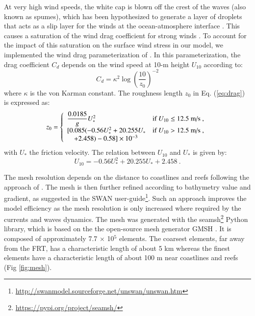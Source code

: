 \documentclass[preprint,12pt,authoryear]{elsarticle}
\begin{document}
At very high wind speeds, the white cap is blown off the crest of the waves (also known as spumes), which has been hypothesized to generate a layer of droplets that acts as a slip layer for the winds at the ocean-atmosphere interface \citep{holthuijsen2012wind}. This causes a saturation of the wind drag coefficient for strong winds \citep{donelan2004limiting,curcic2020revised,powell2003reduced}. To account for the impact of this saturation on the surface wind stress in our model, we implemented the wind drag parameterization of \cite{moon2007physics}. In this parameterization, the drag coefficient $C_d$ depends on the wind speed at 10-m height $U_{10}$ according to:
\begin{equation}
    C_d = \kappa^2 \log\left(\dfrac{10}{z_0}\right)^{-2}\label{eq:drag}
\end{equation}
where $\kappa$ is the von Karman constant. The roughness length $z_0$ in Eq. (\ref{eq:drag}) is expressed as: 
\begin{equation}
    z_0 =\left\{\begin{array}[]{ll}
        \dfrac{0.0185}{g}U_{\ast}^2 & \text{if }U_{10} \leq 12.5\text{ m/s}~, \\
        \lbrack 0.085(-0.56U_{\ast}^2+20.255U_{\ast} & \text{if }U_{10} > 12.5\text{ m/s}~, \\
        \quad +2.458) - 0.58\rbrack\times 10^{-3} 
    \end{array}\right.
\end{equation}
with $U_\ast$ the friction velocity. The relation between $U_{10}$ and $U_{\ast}$ is given by:
\begin{equation}
    U_{10}=-0.56U_{\ast}^2+20.255U_{\ast}+2.458~.
\end{equation}

The mesh resolution depends on the distance to coastlines and reefs following the approach of \cite{dobbelaere2020coupled}. The mesh is then further refined according to bathymetry value and gradient, as suggested in the SWAN user-guide\footnote{\url{http://swanmodel.sourceforge.net/unswan/unswan.htm}}. Such an approach improves the model efficiency as the mesh resolution is only increased where required by the currents and waves dynamics. The mesh was generated with the seamsh\footnote{\url{https://pypi.org/project/seamsh/}} Python library, which is based on the the open-source mesh generator GMSH \citep{geuzaine2009gmsh}. It is composed of approximately 7.7 $\times$ 10$^5$ elements. The coarsest elements, far away from the FRT, has a characteristic length of about 5 km whereas the finest elements have a characteristic length of about 100 m near coastlines and reefs (Fig \ref{fig:mesh}).
\end{document}
